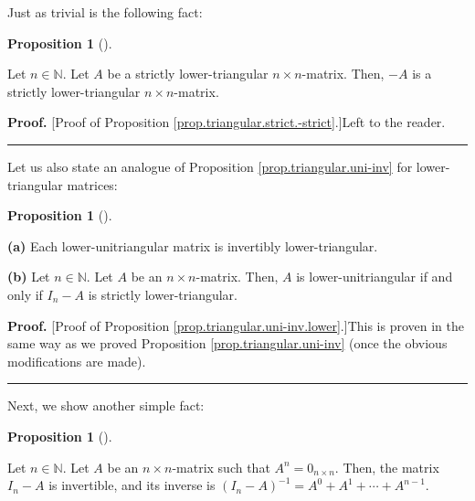 \documentclass[numbers=enddot,12pt,final,onecolumn,notitlepage]{scrartcl}%
\theoremstyle{definition}
\newtheorem{prop}[theo]{Proposition}
\newenvironment{proposition}[1][]
{\begin{prop}[#1]\begin{leftbar}}
{\end{leftbar}\end{prop}}
\newenvironment{proof}[1][Proof]{\noindent\textbf{#1.} }{\ \rule{0.5em}{0.5em}}
\begin{document}
Just as trivial is the following fact:

\begin{proposition}
\label{prop.triangular.strict.-strict}Let $n\in\mathbb{N}$. Let $A$ be a
strictly lower-triangular $n\times n$-matrix. Then, $-A$ is a strictly
lower-triangular $n\times n$-matrix.
\end{proposition}

\begin{proof}
[Proof of Proposition \ref{prop.triangular.strict.-strict}.]Left to the reader.
\end{proof}

Let us also state an analogue of Proposition \ref{prop.triangular.uni-inv} for
lower-triangular matrices:

\begin{proposition}
\label{prop.triangular.uni-inv.lower}\textbf{(a)} Each lower-unitriangular
matrix is invertibly lower-triangular.

\textbf{(b)} Let $n\in\mathbb{N}$. Let $A$ be an $n\times n$-matrix. Then, $A$
is lower-unitriangular if and only if $I_{n}-A$ is strictly lower-triangular.
\end{proposition}

\begin{proof}
[Proof of Proposition \ref{prop.triangular.uni-inv.lower}.]This is proven in
the same way as we proved Proposition \ref{prop.triangular.uni-inv} (once the
obvious modifications are made).
\end{proof}

Next, we show another simple fact:

\begin{proposition}
\label{prop.triangular.strict.geoseries}Let $n\in\mathbb{N}$. Let $A$ be an
$n\times n$-matrix such that $A^{n}=0_{n\times n}$. Then, the matrix $I_{n}-A$
is invertible, and its inverse is $\left(  I_{n}-A\right)  ^{-1}=A^{0}%
+A^{1}+\cdots+A^{n-1}$.
\end{proposition}
\end{document}
